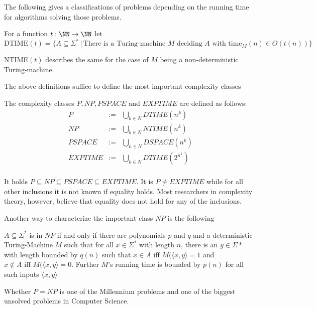       The following gives a classifications of problems depending on the
      running time for algorithms solving those problems.
		\begin{definition}
			For a function $t: \NN \to \NN$ let 
      $$ \text{DTIME}(t) = \{ A \subseteq \Sigma^* \,|\, \text{There is a
      Turing-machine } M \text{ deciding } A \text{ with time}_M(n) \in O(t(n)) \} $$

      NTIME$(t)$ describes the same for the case of $M$ being a
      non-deterministic Turing-machine.
		\end{definition}
		The above definitions suffice to define the most important complexity classes
		\begin{definition}
			The complexity classes $P, NP, PSPACE$ and $EXPTIME$ are defined as follows:
			\begin{eqnarray*}
				P & := & \bigcup_{k \in N} DTIME(n^k) \\
				NP & := & \bigcup_{k \in N} NTIME(n^k) \\
				PSPACE & := & \bigcup_{n \in N} DSPACE(n^k) \\
				EXPTIME & := & \bigcup_{k \in N} DTIME(2^{n^k}) \\
			\end{eqnarray*}
		\end{definition}
		It holds $P \subseteq NP \subseteq PSPACE \subseteq EXPTIME$. 
		It is $P \neq EXPTIME$ while for all other inclusions it is not known if equality holds.
    Most researchers in complexity theory, however, believe that equality does
    not hold for any of the inclusions.

    Another way to characterize the important class $NP$ is the following
    \begin{theorem}
      $A \subseteq \Sigma^*$ is in $NP$ if and only if there are polynomials
      $p$ and $q$ and a deterministic Turing-Machine $M$ such that for all $x
      \in \Sigma^*$ with length $n$, there is an $y \in \Sigma*$ with length
      bounded by $q(n)$ such that $x \in A \text{ iff } M(\langle x,y \rangle = 1$ and 
      $x \not \in A \text{ iff } M(\langle x,y \rangle = 0$. 
      Further $M$'s running time is bounded by $p(n)$ for all such inputs
      $\langle x,y \rangle$
    \end{theorem}
		Whether $P = NP$ is one of the Millennium problems and one of the biggest unsolved problems in Computer Science.

